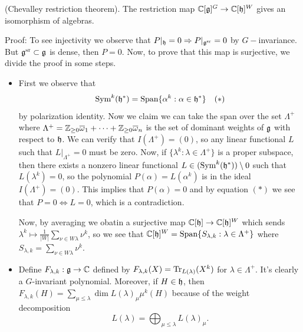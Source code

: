 \begin{dang}
    \begin{theorem}
        (Chevalley restriction theorem). The restriction map $\mathbb{C}[\mathfrak{g}]^G\rightarrow\mathbb{C}[\mathfrak{h}]^W$
        gives an isomorphism of algebras. 
    \end{theorem}
\end{dang}
Proof: To see injectivity we observe that $P|_{\mathfrak{h}}=0\Rightarrow P|_{\mathfrak{g}^{\text{sr}}}=0$ by $G-$invariance. 
But $\mathfrak{g}^{\text{sr}}\subset \mathfrak{g}$ is dense, then $P=0$. Now, to prove that this map is surjective, 
we divide the proof in some steps.
\begin{itemize}
    \item[(1)] First we observe that 
    \begin{equation}
        \text{Sym}^k(\mathfrak{h}^*)=\text{Span}\{\alpha^k:\alpha\in\mathfrak{h}^*\}\quad(*)
    \end{equation}
    by polarization 
    identity. Now we claim we can take the span over the set $\Lambda^+$ where 
    $\Lambda^+=\mathbb{Z}_{\geq0}\overline{\omega}_1+\cdots+\mathbb{Z}_{\geq0}\overline{\omega}_n$ is the set of dominant weights 
    of $\mathfrak{g}$ with respect to $\mathfrak{h}$. We can verify that $I(\Lambda^+)=(0)$, so any 
    linear functional $L$ such that $L|_{\Lambda^+}=0$ must be zero. Now, if 
    $\{\lambda^k:\lambda\in\Lambda^+\}$ is a proper subspace, then there exists a nonzero linear functional 
    $L\in (\text{Sym}^k(\mathfrak{h}^*))\setminus0$ such that $L(\lambda^k)=0$, so the polynomial $P(\alpha)=L(\alpha^k)$ 
    is in the ideal $I(\Lambda^+)=(0)$. This implies that $P(\alpha) = 0$ and by equation $(*)$ we see that 
    $P=0\iff L=0$, which is a contradiction.\par 
    Now, by averaging we obatin a surjective map $\mathbb{C}[\mathfrak{h}]\to \mathbb{C}[\mathfrak{h}]^W$ which sends 
    $\lambda^k\mapsto \frac{1}{|W|}\sum_{\nu\in W\lambda}\nu^k$, so we see that 
    $\mathbb{C}[\mathfrak{h}]^W=\text{Span}\{S_{\lambda,k}:\lambda\in\Lambda^+\}$ where $S_{\lambda,k}=\sum_{\nu\in W\lambda}\nu^k$.
    \item[(2)] Define $F_{\lambda,k}:\mathfrak{g}\to\mathbb{C}$ defined by 
    $F_{\lambda,k}(X)=\text{Tr}_{L(\lambda)}(X^k)$ for $\lambda\in\Lambda^+$. It's clearly a $G$-invariant polynomial. Moreover, if 
    $H\in\mathfrak{h}$, then $F_{\lambda,k}(H)=\sum_{\mu\leq\lambda}\dim L(\lambda)_\mu \mu^k(H)$ because of the weight decomposition
    \begin{equation}
        L(\lambda)=\bigoplus_{\mu\leq\lambda}L(\lambda)_\mu.
    \end{equation}

\end{itemize}
